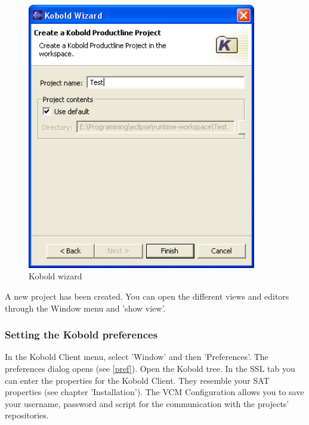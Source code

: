 \begin{figure}[h!]
\begin{center}
\includegraphics[width=10cm]{wizard3.png}
   \caption{Kobold wizard}
\label{wizard3}
\end{center}
\end{figure}\par

A new project has been created. You can open the different views and editors through the Window menu
and 'show view'. 

\subsubsection{Setting the Kobold preferences}
In the Kobold Client menu, select 'Window' and then 'Preferences'. The preferences
dialog opens (see \ref{pref}). Open the Kobold tree. In the SSL tab you can enter the 
properties for the Kobold Client. They resemble your SAT properties (see chapter 'Installation').
The VCM Configuration allows you to save your username, password and script for the
communication with the projects' repositories.


